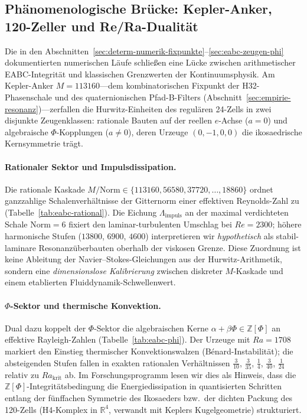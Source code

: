 \subsection{Phänomenologische Brücke: Kepler-Anker, 120-Zeller und Re/Ra-Dualität}\label{sec:eabc-phaenomenologie}

Die in den Abschnitten~\ref{sec:determ-numerik-fixpunkte}--\ref{sec:eabc-zeugen-phi} dokumentierten numerischen Läufe schließen eine Lücke zwischen arithmetischer EABC-Integrität und klassischen Grenzwerten der Kontinuumsphysik. Am Kepler-Anker $M=113160$---dem kombinatorischen Fixpunkt der H32-Phasenschale und des quaternionischen Pfad-B-Filters (Abschnitt~\ref{sec:empirie-resonanz})---zerfallen die Hurwitz-Einheiten des regulären 24-Zells in zwei disjunkte Zeugenklassen: rationale Bauten auf der reellen $e$-Achse ($a=0$) und algebraische $\Phi$-Kopplungen ($a\neq 0$), deren Urzeuge $(0,-1,0,0)$ die ikosaedrische Kernsymmetrie trägt.

\paragraph{Rationaler Sektor und Impulsdissipation.}
Die rationale Kaskade $M/\mathrm{Norm}\in\{113160,56580,37720,\ldots,18860\}$ ordnet ganzzahlige Schalenverhältnisse der Gitternorm einer effektiven Reynolds-Zahl zu (Tabelle~\ref{tab:eabc-rational}). Die Eichung $\Lambda_{\mathrm{impuls}}$ an der maximal verdichteten Schale $\mathrm{Norm}=6$ fixiert den laminar-turbulenten Umschlag bei $Re=2300$; höhere harmonische Stufen ($13800$, $6900$, $4600$) interpretieren wir \emph{hypothetisch} als stabil-laminare Resonanzüberbauten oberhalb der viskosen Grenze. Diese Zuordnung ist keine Ableitung der Navier--Stokes-Gleichungen aus der Hurwitz-Arithmetik, sondern eine \emph{dimensionslose Kalibrierung} zwischen diskreter $M$-Kaskade und einem etablierten Fluiddynamik-Schwellenwert.

\paragraph{$\Phi$-Sektor und thermische Konvektion.}
Dual dazu koppelt der $\Phi$-Sektor die algebraischen Kerne $\alpha+\beta\Phi\in\mathbb{Z}[\Phi]$ an effektive Rayleigh-Zahlen (Tabelle~\ref{tab:eabc-phi}). Der Urzeuge mit $Ra=1708$ markiert den Einstieg thermischer Konvektionswalzen (Bénard-Instabilität); die absteigenden Stufen fallen in exakten rationalen Verhältnissen $\tfrac{3}{10}$, $\tfrac{3}{35}$, $\tfrac{1}{4}$, $\tfrac{3}{40}$, $\tfrac{1}{24}$ relativ zu $Ra_{\mathrm{krit}}$ ab. Im Forschungsprogramm lesen wir dies als Hinweis, dass die $\mathbb{Z}[\Phi]$-Integritätsbedingung die Energiedissipation in quantisierten Schritten entlang der fünffachen Symmetrie des Ikosaeders bzw.\ der dichten Packung des 120-Zells (H4-Komplex in $\mathbb{R}^4$, verwandt mit Keplers Kugelgeometrie) strukturiert.


